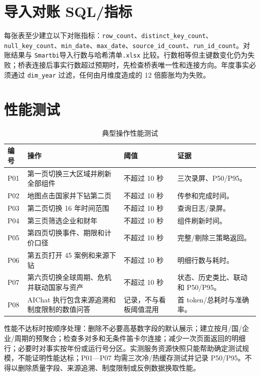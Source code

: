 \documentclass[UTF8,fontset=windows,12pt,openany]{ctexbook}
\newcommand{\Field}[1]{{\small\nolinkurl{#1}}}
\newcommand{\File}[1]{{\small\begingroup\urlstyle{same}\nolinkurl{#1}\endgroup}}
\begin{document}
\section{导入对账 SQL/指标}

每张表至少建立以下对账指标：\Field{row_count}、\Field{distinct_key_count}、\Field{null_key_count}、\Field{min_date}、\Field{max_date}、\Field{source_id_count}、\Field{run_id_count}。对账结果与 \File{Smartbi}\textsf{导入行数与哈希清单}\File{.xlsx} 比较。行数相等但主键数变化仍为失败；桥表连接后事实行数超过预期时，先检查桥表唯一性和连接方向。年度事实必须通过 \Field{dim_year} 过滤，任何由月维度造成的 12 倍膨胀均为失败。

\section{性能测试}

\begin{longtable}{p{2.0cm}p{4.7cm}p{3.1cm}p{3.8cm}}
\caption{典型操作性能测试}\label{tab:performance}\\
\toprule
\textbf{编号} & \textbf{操作} & \textbf{阈值} & \textbf{证据}\\
\midrule
P01 & 第一页切换三大区域并刷新全部组件 & 不超过 10 秒 & 三次录屏、P50/P95。\\
P02 & 地图点击国家并下钻第二页 & 不超过 10 秒 & 传参和完成时间。\\
P03 & 第二页切换 16 年时间范围 & 不超过 10 秒 & 查询日志/录屏。\\
P04 & 第三页筛选企业和财年 & 不超过 10 秒 & 组件刷新时间。\\
P05 & 第四页切换事件、期限和计价口径 & 不超过 10 秒 & 完整/剔除三策略返回。\\
P06 & 第五页打开 45 案例和来源下钻 & 不超过 10 秒 & 明细行数与耗时。\\
P07 & 第六页切换全球周期、危机并联动国家与资产 & 不超过 10 秒 & 状态、历史类比、联动和 P50/P95。\\
P08 & AIChat 执行包含来源追溯和制度限制的数值问答 & 记录，不与看板阈值混用 & 首 token/总耗时与准确率。\\
\bottomrule
\end{longtable}

性能不达标时按顺序处理：删除不必要高基数字段的默认展示；建立按月/国/企业/周期的预聚合；检查多对多和无条件笛卡尔连接；减少一次页面返回的明细行；必要时对事实按年份或运行号分区。实测服务资源快照只能帮助确定测试规模，不能证明性能达标；P01—P07 均需三次冷/热缓存测试并记录 P50/P95。不得以删除质量字段、来源追溯、制度限制或反例数据换取性能。
\end{document}

